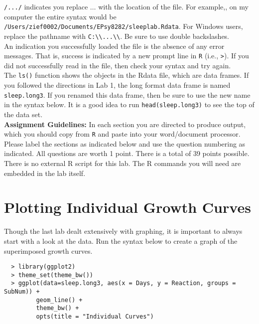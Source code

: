 \documentclass[]{article}
\begin{document}
\noindent \verb,/.../, indicates you replace $\ldots$ with the location of the file. For example,, on my computer the entire syntax would be \texttt{/Users/zief0002/Documents/EPsy8282/sl\allowbreak eeplab.Rdata}. For Windows users, replace the pathname with \verb,C:\\...\\,. Be sure to use double backslashes. \\
\linebreak
An indication you successfully loaded the file is the absence of any error messages. That is,
success is indicated by a new prompt line in \texttt{R} (i.e., \texttt{>}). If you did not
successfully read in the file, then check your syntax and try again. \\
\linebreak
The \texttt{ls()} function shows the objects in the Rdata file, which are data frames. If you
followed the directions in Lab 1, the long format data frame is named \texttt{sleep.long3}. If you renamed this data frame, then be sure to use the new name in the syntax below. It is a good idea to run \texttt{head(sleep.long3)} to see the top of the data set.\\
\linebreak
\textbf{Assignment Guidelines:} In each section you are directed to produce output, which you should copy from \texttt{R} and paste into your word/document processor. Please label the sections as indicated below and use the question numbering as indicated. All questions are worth 1 point. There is a total of 39 points possible. There is no external R script for this lab. The R commands you will need are embedded in the lab itself.

\pagebreak

%
%

\section*{Plotting Individual Growth Curves} 
 
\noindent Though the last lab dealt extensively with graphing, it is important to always start with a look at the data. Run the syntax below to create a graph of the superimposed growth curves.

\begin{verbatim}
  > library(ggplot2)
  > theme_set(theme_bw())
  > ggplot(data=sleep.long3, aes(x = Days, y = Reaction, groups = SubNum)) + 
         geom_line() + 
         theme_bw() + 
         opts(title = "Individual Curves")
\end{verbatim}
\end{document}
